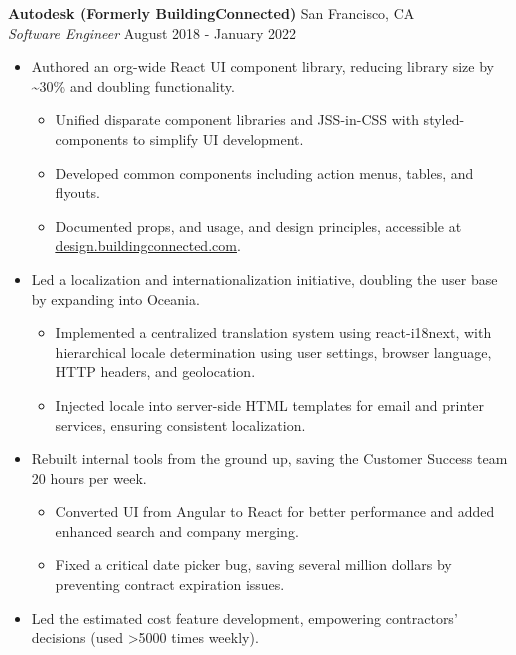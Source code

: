 \documentclass[a4paper]{article}
\begin{document}
\textbf{Autodesk (Formerly BuildingConnected)} \hfill San Francisco, CA\\
\textit{Software Engineer} \hfill August 2018 - January 2022\\
\vspace{-1mm}
\begin{itemize} \itemsep .5pt
    \item Authored an org-wide React UI component library, reducing library size by \textasciitilde{}30\% and doubling functionality.
    \begin{itemize} \itemsep .5pt
        \item Unified disparate component libraries and JSS-in-CSS with styled-components to simplify UI development.
        \item Developed common components including action menus, tables, and flyouts.
        \item Documented props, and usage, and design principles, accessible at \href{https://design.buildingconnected.com/}{\underline{design.buildingconnected.com}}.
        \end{itemize}
    \item Led a localization and internationalization initiative, doubling the user base by expanding into Oceania.
    \begin{itemize} \itemsep .5pt
            \item Implemented a centralized translation system using react-i18next, with hierarchical locale determination using user settings, browser language, HTTP headers, and geolocation.
            \item Injected locale into server-side HTML templates for email and printer services, ensuring consistent localization.  
        \end{itemize}
    \item Rebuilt internal tools from the ground up, saving the Customer Success team 20 hours per week.
    \begin{itemize} \itemsep .5pt
            \item Converted UI from Angular to React for better performance and added enhanced search and company merging.
            \item Fixed a critical date picker bug, saving several million dollars by preventing contract expiration issues.
        \end{itemize}
    \item Led the estimated cost feature development, empowering contractors' decisions (used >5000 times weekly).

\end{itemize}
\end{document}
